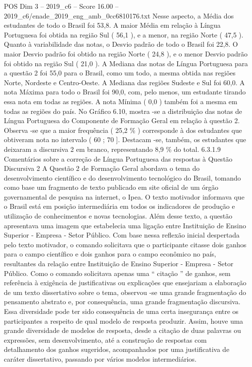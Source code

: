 \begin{textsample}{POS Dim 3 – 2019\_c6 – Score 16.00 – 2019\_c6/enade\_2019\_eng\_amb\_0cc6810176.txt}
Nesse aspecto, a Média dos estudantes de todo o Brasil foi 53,8.
A maior Média em relação à Língua Portuguesa foi obtida na região Sul ( 56,1 ), e a menor, na região Norte ( 47,5 ).
Quanto à variabilidade das notas, o Desvio padrão de todo o Brasil foi 22,8.
O maior Desvio padrão foi obtido na região Norte ( 24,8 ), e o menor Desvio padrão foi obtido na região Sul ( 21,0 ).
A Mediana das notas de Língua Portuguesa para a questão 2 foi 55,0 para o Brasil, como um todo, a mesma obtida nas regiões Norte, Nordeste e Centro-Oeste.
A Mediana das regiões Sudeste e Sul foi 60,0.
A nota Máxima para todo o Brasil foi 90,0, com, pelo menos, um estudante tirando essa nota em todas as regiões.
A nota Mínima ( 0,0 ) também foi a mesma em todas as regiões do país.
No Gráfico 6.10, mostra -se a distribuição das notas de Língua Portuguesa do Componente de Formação Geral em relação à questão 2.
Observa -se que a maior frequência ( 25,2 \% ) corresponde à dos estudantes que obtiveram nota no intervalo ( 60 ; 70 ].
Destacam -se, também, os estudantes que deixaram a discursiva 2 em branco, representando 8,9 \% do total. 6.3.1.9 Comentários sobre a correção de Língua Portuguesa das respostas à Questão Discursiva 2 A Questão 2 de Formação Geral abordava o tema do desenvolvimento científico e do desenvolvimento tecnológico do Brasil, tomando como base um fragmento de texto publicado em site oficial de um órgão governamental de pesquisa na internet, o Ipea.
O texto motivador informava que o Brasil está em posição intermediária em todos os indicadores de produção e utilização de conhecimentos e novas tecnologias.
Além desse texto, a questão apresentava uma imagem que estabelecia uma ligação entre Instituição de Ensino Superior - Empresa - Setor Público.
Com base nessa reflexão inicial despertada pelo texto motivador, o comando solicitava que o participante citasse dois ganhos para o campo científico e dois ganhos para o campo econômico no país, resultantes da relação entre Instituição de Ensino Superior - Empresa - Setor Público.
Como o comando solicitava apenas uma “ citação ” de ganhos, sem referência à exigência de justificativas ou explicações que ensejariam a elaboração de um texto dissertativo sobre o tema, observou -se uma grande fragmentação do pensamento abstrato e, por consequência, uma grande fragmentação discursiva.
Essa diversidade pode ter sido consequência de uma certa insegurança entre os participantes a respeito de qual modelo de resposta produzir.
Assim, houve uma grande diversidade de modelos de resposta, desde a citação de duas palavras ou expressões, sem desenvolvimento, até a construção de respostas com detalhamento dos ganhos sugeridos, acompanhados por uma justificativa de caráter dissertativo, passando por vários modelos intermediários.

\end{textsample}
